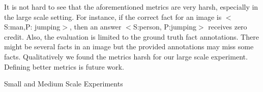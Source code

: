 \documentclass[runningheads]{llncs}
\begin{document}
It is not hard to see that the aforementioned metrics are very harsh, especially in the large scale setting. For instance, if the correct fact for an image is $<$S:man,P:  jumping$>$, then an answer $<$S:person, P:jumping$>$ receives zero credit. Also, the evaluation is limited to the ground truth fact annotations. There might be several facts in an image but the provided annotations may miss some facts. Qualitatively we found the metrics harsh for our large scale experiment.
Defining better metrics is future work.
\vspace{-10mm}
\centering
 \caption{Small and Medium Scale Experiments}
  \label{ttbl_smDS}
\end{document}
